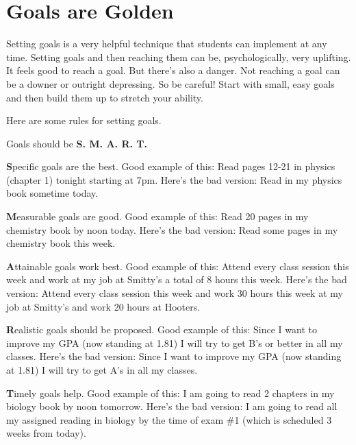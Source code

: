\chapter{Goals are Golden}

Setting goals is a very helpful technique that students can implement at any time. Setting goals and then reaching them can be, psychologically, very uplifting. It feels good to reach a goal. But there's also a danger. Not reaching a goal can be a downer or outright depressing. So be careful! Start with small, easy goals and then build them up to stretch your ability.

Here are some rules for setting goals. 

Goals should be \textbf{S. M. A. R. T.}

\textbf{S}pecific goals are the best. Good example of this: Read pages 12-21 in physics (chapter 1) tonight starting at 7pm. Here's the bad version: Read in my physics book sometime today.

\textbf{M}easurable goals are good. Good example of this: Read 20 pages in my chemistry book by noon today. Here's the bad version: Read some pages in my chemistry book this week.

\textbf{A}ttainable goals work best. Good example of this: Attend every class session this week and work at my job at Smitty's a total of 8 hours this week. Here's the bad version: Attend every class session this week and work 30 hours this week at my job at Smitty's and work 20 hours at Hooters.

\textbf{R}ealistic goals should be proposed. Good example of this: Since I want to improve my GPA (now standing at 1.81) I will try to get B's or better in all my classes. Here's the bad version: Since I want to improve my GPA (now standing at 1.81) I will try to get A's in all my classes.

\textbf{T}imely goals help. Good example of this: I am going to read 2 chapters in my biology book by noon tomorrow. Here's the bad version: I am going to read all my assigned reading in biology by the time of exam \#1 (which is scheduled 3 weeks from today).